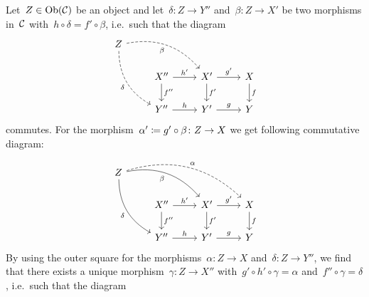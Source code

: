 Let~$Z \in \operatorname{Ob}(\mathcal{C})$ be an object and let~$\delta \colon Z \to Y''$ and~$\beta \colon Z \to X'$ be two morphisms in~$\mathcal{C}$ with~$h \circ \delta = f' \circ \beta$, i.e.\ such that the diagram
\[
  \begin{tikzcd}
      Z
      \arrow[dashed,bend left]{drr}[below left]{\beta}
      \arrow[dashed,bend right]{ddr}[below left]{\delta}
    & {}
    & {}
    & {}
    \\
      {}
    & X''
      \arrow{r}[above]{h'}
      \arrow{d}[right]{f''}
    & X'
      \arrow{r}[above]{g'}
      \arrow{d}[right]{f'}
    & X
      \arrow{d}[right]{f}
    \\
      {}
    & Y''
      \arrow{r}[above]{h}
    & Y'
      \arrow{r}[above]{g}
    & Y
  \end{tikzcd}
\]
commutes.
For the morphism~$\alpha' \coloneqq g' \circ \beta \colon Z \to X$ we get following commutative diagram:
\[
  \begin{tikzcd}
      Z
      \arrow[dashed,bend left]{drrr}[above right]{\alpha}
      \arrow[bend left]{drr}[below left]{\beta}
      \arrow[bend right]{ddr}[below left]{\delta}
    & {}
    & {}
    & {}
    \\
      {}
    & X''
      \arrow{r}[above]{h'}
      \arrow{d}[right]{f''}
    & X'
      \arrow{r}[above]{g'}
      \arrow{d}[right]{f'}
    & X
      \arrow{d}[right]{f}
    \\
      {}
    & Y''
      \arrow{r}[above]{h}
    & Y'
      \arrow{r}[above]{g}
    & Y
  \end{tikzcd}
\]
By using the outer {\pb} square for the morphisms~$\alpha \colon Z \to X$ and~$\delta \colon Z \to Y''$, we find that there exists a unique morphism~$\gamma \colon Z \to X''$  with~$g' \circ h' \circ \gamma = \alpha$ and~$f'' \circ \gamma = \delta$, i.e.\ such that the diagram
